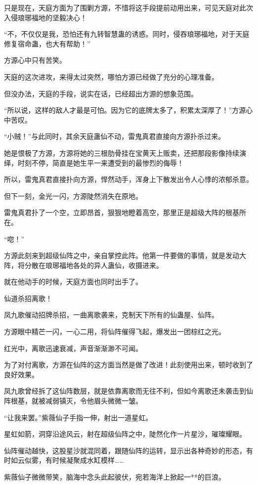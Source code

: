 \begin{this_body}
只是现在，天庭方面为了围剿方源，不惜将这手段提前动用出来，可见天庭对此次入侵琅琊福地的坚毅决心！

“不，不仅仅是我，恐怕还有九转智慧蛊的诱惑。同时，侵吞琅琊福地，对于天庭修复宿命蛊，也大有帮助！”

方源心中只有苦笑。

天庭的这次进攻，来得太过突然，哪怕方源已经做了充分的心理准备。

但没办法，天庭的手段，说实在话，已经超出方源的想象范围。

“所以说，这样的敌人才最是可怕。因为它的底牌太多了，积累太深厚了！”方源心中苦叹。

“小贼！”与此同时，其余天庭蛊仙不动，雷鬼真君直接向方源扑杀过来。

她是恨极了方源，方源将她的三根肋骨挂在宝黄天上贩卖，还把那段影像持续演绎，时刻不停，简直是她生平一来遭受到的最惨烈的侮辱！

所以，雷鬼真君直接扑向方源，悍然动手，浑身上下散发出令人心悸的浓郁杀意。

但下一刻，金光一闪，方源陡然消失在原地。

雷鬼真君扑了一个空，立即昂首，狠狠地瞪着高空，那里正是超级大阵的根基所在。

“唿！”

方源此刻来到超级仙阵之中，亲自掌控此阵。他第一件要做的事情，就是发动大阵，将分散在琅琊福地各处的异人蛊仙，收摄进来。

就在他动手的时候，天庭方面也同时出手了。

仙道杀招离歌！

凤九歌催动招牌杀招，一曲离歌袭来，克制天下所有的仙蛊屋、仙阵。

方源眼中精芒一闪，一心二用，将仙阵催得飞起，爆发出一团棕红之光。

红光中，离歌迅速衰减，声音渐渐渺不可闻。

为了对付离歌，方源在仙阵的这方面当然是做了改进！此刻使用出来，顿时收到了良好效果。

凤九歌曾经拆了这仙阵数层，就是依靠离歌而无往不利，但如今离歌还未袭击到仙阵根基，就被减弱镇灭，令他眉头微微一皱。

“让我来罢。”紫薇仙子手指一伸，射出一道星虹。

星虹如箭，洞穿沿途风云，射在超级仙阵之中，陡然化作一片星沙，璀璨耀眼。

仙阵催动越快，这股星沙就混同着，跟随仙阵的运转，显示出各种奇妙的形态，有时如云似雾，有时候凝聚成水缸模样……

紫薇仙子微微带笑，脑海中念头此起彼伏，宛若海洋上掀起一**的巨浪。


\end{this_body}
